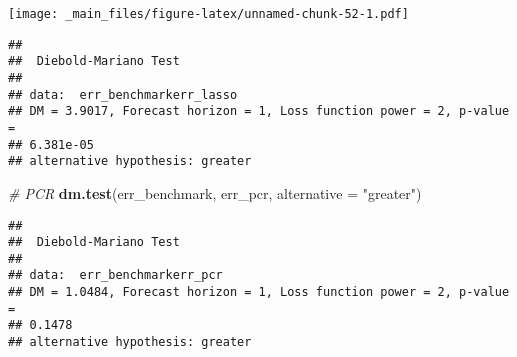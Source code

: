 \documentclass[
]{book}
\newenvironment{Shaded}{\begin{snugshade}}{\end{snugshade}}
\newcommand{\AttributeTok}[1]{\textcolor[rgb]{0.13,0.29,0.53}{#1}}
\newcommand{\CommentTok}[1]{\textcolor[rgb]{0.56,0.35,0.01}{\textit{#1}}}
\newcommand{\DocumentationTok}[1]{\textcolor[rgb]{0.56,0.35,0.01}{\textbf{\textit{#1}}}}
\newcommand{\FunctionTok}[1]{\textcolor[rgb]{0.13,0.29,0.53}{\textbf{#1}}}
\newcommand{\NormalTok}[1]{#1}
\newcommand{\OtherTok}[1]{\textcolor[rgb]{0.56,0.35,0.01}{#1}}
\newcommand{\SpecialCharTok}[1]{\textcolor[rgb]{0.81,0.36,0.00}{\textbf{#1}}}
\newcommand{\StringTok}[1]{\textcolor[rgb]{0.31,0.60,0.02}{#1}}
\begin{document}
\texttt{[image: \_main\_files/figure-latex/unnamed-chunk-52-1.pdf]}

\begin{Shaded}
\end{Shaded}

\begin{verbatim}
## 
##  Diebold-Mariano Test
## 
## data:  err_benchmarkerr_lasso
## DM = 3.9017, Forecast horizon = 1, Loss function power = 2, p-value =
## 6.381e-05
## alternative hypothesis: greater
\end{verbatim}

\begin{Shaded}
\begin{Highlighting}[]
\CommentTok{\# PCR}
\FunctionTok{dm.test}\NormalTok{(err\_benchmark, err\_pcr, }\AttributeTok{alternative =} \StringTok{"greater"}\NormalTok{) }
\end{Highlighting}
\end{Shaded}

\begin{verbatim}
## 
##  Diebold-Mariano Test
## 
## data:  err_benchmarkerr_pcr
## DM = 1.0484, Forecast horizon = 1, Loss function power = 2, p-value =
## 0.1478
## alternative hypothesis: greater
\end{verbatim}
\end{document}
